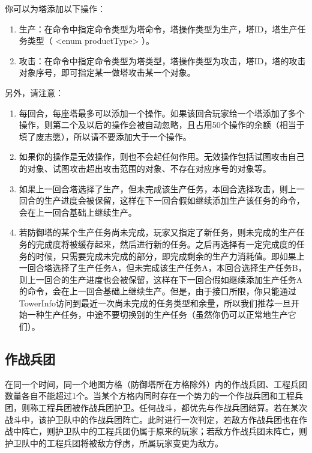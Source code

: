 \documentclass[a4paper,4pt]{article}
\begin{document}
你可以为塔添加以下操作：
\begin{enumerate}[fullwidth, itemindent=2em, label=(\arabic*)]
  \item 生产：在命令中指定命令类型为塔命令，塔操作类型为生产，塔ID，塔生产任务类型（ <enum  productType> ）。
  \item 攻击：在命令中指定命令类型为塔类型，塔操作类型为攻击，塔ID，塔的攻击对象序号，即可指定某一做塔攻击某一个对象。
\end{enumerate}
另外，请注意：
\begin{enumerate}[fullwidth, itemindent=2em, label=(\arabic*)]
  \item 每回合，每座塔最多可以添加一个操作。如果该回合玩家给一个塔添加了多个操作，则第二个及以后的操作会被自动忽略，且占用50个操作的余额（相当于填了废志愿），所以请不要添加大于一个操作。
  \item 如果你的操作是无效操作，则也不会起任何作用。无效操作包括试图攻击自己的对象、试图攻击超出攻击范围的对象、不存在对应序号的对象等。
  \item 如果上一回合塔选择了生产，但未完成该生产任务，本回合选择攻击，则上一回合的生产进度会被保留，这样在下一回合假如继续添加生产该任务的命令，会在上一回合基础上继续生产。
  \item 若防御塔的某个生产任务尚未完成，玩家又指定了新任务，则未完成的生产任务的完成度将被缓存起来，然后进行新的任务。之后再选择有一定完成度的任务的时候，只需要完成未完成的部分，即完成剩余的生产力消耗值。即如果上一回合塔选择了生产任务A，但未完成该生产任务A，本回合选择生产任务B，则上一回合的生产进度也会被保留，这样在下一回合假如继续添加生产任务A的命令，会在上一回合基础上继续生产。但是，由于接口所限，你只能通过TowerInfo访问到最近一次尚未完成的任务类型和余量，所以我们推荐一旦开始一种生产任务，中途不要切换别的生产任务（虽然你仍可以正常地生产它们）。
\end{enumerate}
\subsection{作战兵团}
在同一个时间，同一个地图方格（防御塔所在方格除外）内的作战兵团、工程兵团数量各自不能超过1个。当某个方格内同时存在一个势力的一个作战兵团和工程兵团，则称工程兵团被作战兵团护卫。任何战斗，都优先与作战兵团结算。若在某次战斗中，该护卫队中的作战兵团阵亡。此时进行一次判定，若敌方作战兵团也在作战中阵亡，则护卫队中的工程兵团仍属于原来的玩家；若敌方作战兵团未阵亡，则护卫队中的工程兵团将被敌方俘虏，所属玩家变更为敌方。\par
\end{document}
